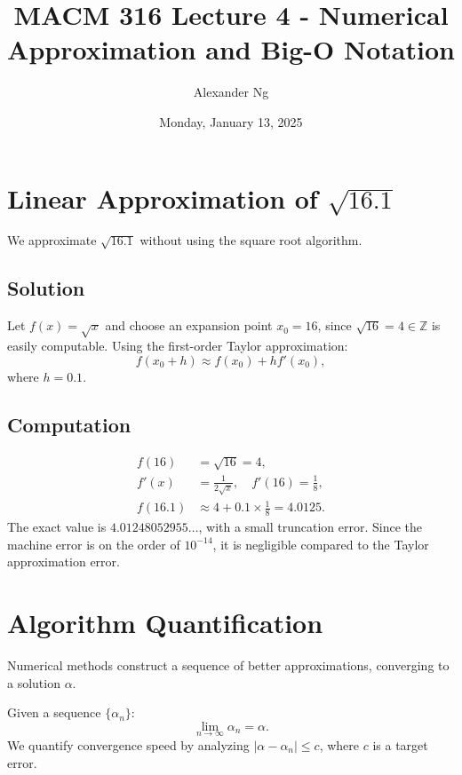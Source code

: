 \documentclass[12pt]{article}
\begin{document}
\title{MACM 316 Lecture 4 - Numerical Approximation and Big-O Notation}
\author{Alexander Ng}
\date{Monday, January 13, 2025}

\maketitle
\section{Linear Approximation of $\sqrt{16.1}$}

We approximate $\sqrt{16.1}$ without using the square root algorithm.

\subsection{Solution}
Let $f(x) = \sqrt{x}$ and choose an expansion point $x_0 = 16$, since 
$\sqrt{16} = 4 \in \mathbb{Z}$ is easily computable. Using the first-order 
Taylor approximation:
\begin{equation*}
    f(x_0 + h) \approx f(x_0) + h f'(x_0),
\end{equation*}
where $h = 0.1$.

\subsection{Computation}
\begin{align*}
    f(16) &= \sqrt{16} = 4, \\
    f'(x) &= \frac{1}{2\sqrt{x}}, \quad f'(16) = \frac{1}{8}, \\
    f(16.1) &\approx 4 + 0.1 \times \frac{1}{8} = 4.0125.
\end{align*}
The exact value is $4.01248052955\dots$, with a small truncation error.
Since the machine error is on the order of $10^{-14}$, it is negligible compared 
to the Taylor approximation error.

\section{Algorithm Quantification}

Numerical methods construct a sequence of better approximations, converging to 
a solution $\alpha$.

Given a sequence $\{\alpha_n\}$:
\begin{equation*}
    \lim_{n\to\infty} \alpha_n = \alpha.
\end{equation*}
We quantify convergence speed by analyzing $|\alpha - \alpha_n| \leq c$, where 
$c$ is a target error.
\end{document}

